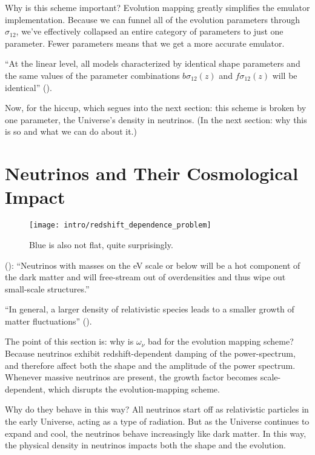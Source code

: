 Why is this scheme important? Evolution mapping greatly simplifies the emulator
implementation. Because we can
funnel all of the evolution parameters through $\sigma_{12}$, we've effectively
collapsed an entire category of parameters to just one parameter. Fewer
parameters means that we get a more accurate emulator.

``At the linear level, all models characterized by identical shape parameters
and the same values of the parameter combinations $b \sigma_{12}(z)$ and
$f \sigma_{12}(z)$ will be identical'' ().

Now, for the hiccup, which segues into the next section: this scheme is broken by one parameter, the Universe's
density in neutrinos. (In the next section: why this is so and what we can do
about it.)


\section{Neutrinos and Their Cosmological Impact}

\begin{figure}[htb]
  \centering
  \texttt{[image: intro/redshift\_dependence\_problem]}
  \caption[Redshift Dependence of Neutrino Impact]{Blue is also not flat,
  	quite surprisingly.}
  \label{fig: neutrinos_and_redshift}
\end{figure}

(): ``Neutrinos with masses on the eV scale or below will be a
hot component of the dark matter and will free-stream out of overdensities and
thus wipe out small-scale structures.''

``In general, a larger density of relativistic species leads to a smaller
growth of matter fluctuations'' ().

The point of this section is: why is $\omega_\nu$ bad for the
evolution mapping scheme? Because neutrinos exhibit redshift-dependent
damping of the power-spectrum, and therefore affect both the shape and the
amplitude of the power spectrum. Whenever massive neutrinos are present,
the growth factor becomes scale-dependent, which disrupts the
evolution-mapping scheme.

Why do they behave in this way? All neutrinos start off as
relativistic particles in the early Universe, acting as a type of radiation.
But as the Universe continues to expand and cool, the neutrinos behave
increasingly like dark matter.
In this way, the physical density in neutrinos impacts both the shape and the
evolution.

